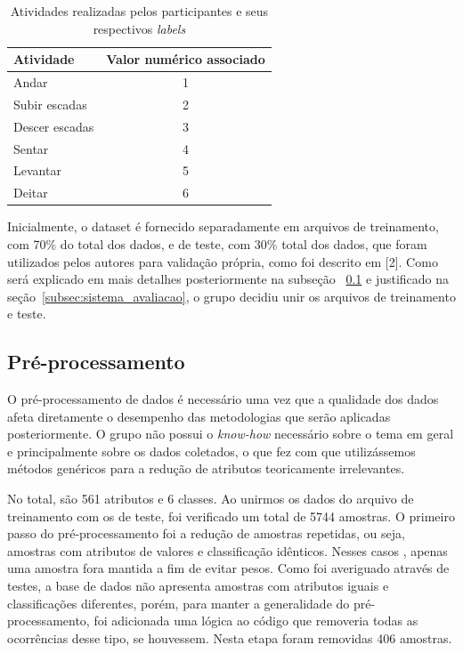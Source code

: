 \documentclass[10pt, conference, compsocconf]{IEEEtran}
\begin{document}
\begin{table}[h]
\begin{center}
    \caption{Atividades realizadas pelos participantes e seus respectivos
    \textit{labels}}\label{tab:labels}
    \begin{tabular}{| l | c |}
        \hline
        Atividade & Valor numérico associado\\
        \hline
        Andar & 1\\
        Subir escadas & 2\\
        Descer escadas & 3\\
        Sentar & 4\\
        Levantar & 5\\
        Deitar & 6\\
        \hline
    \end{tabular}
\end{center}
\end{table}

Inicialmente, o dataset é fornecido separadamente em arquivos de 
treinamento, com 70\% do total dos dados, e de teste, com 30\% total dos dados, 
que foram utilizados pelos autores para validação própria, como foi descrito em 
[2]. Como será explicado em mais detalhes posteriormente na subseção
~\ref{sec:pre_processamento} e justificado na
seção~\ref{subsec:sistema_avaliacao}, o grupo decidiu unir os arquivos de treinamento e teste. 


\subsection{Pré-processamento}\label{sec:pre_processamento}
O pré-processamento de dados é necessário uma vez que a qualidade 
dos dados afeta diretamente o desempenho das metodologias que serão aplicadas 
posteriormente. O grupo não possui o \textit{know-how} necessário sobre o tema
em geral e principalmente sobre os dados coletados, 
o que fez com que utilizássemos métodos genéricos para a redução de atributos teoricamente irrelevantes.

No total, são 561 atributos e 6 classes. Ao unirmos os dados do arquivo de
treinamento com os de teste, foi verificado um total de 5744 amostras.
O primeiro passo do pré-processamento foi a redução de amostras repetidas, ou 
seja, amostras com atributos de valores e classificação idênticos. Nesses casos
, apenas uma amostra fora mantida a fim de evitar pesos. Como foi averiguado 
através de testes, a base de dados não apresenta amostras com atributos iguais e
classificações diferentes, porém, para manter a generalidade do
pré-processamento, foi adicionada uma lógica ao código que removeria todas as 
ocorrências desse tipo, se houvessem. Nesta etapa foram removidas 406 amostras.
\end{document}
